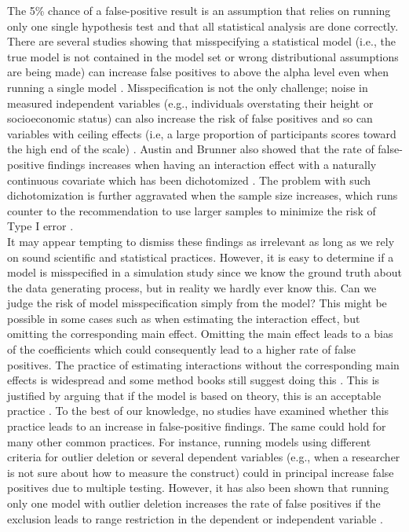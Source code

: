 The 5\% chance of a false-positive result is an assumption that relies on running only one single hypothesis test and that all statistical analysis are done correctly. There are several studies showing that misspecifying a statistical model (i.e., the true model is not contained in the model set or wrong distributional assumptions are being made) can increase false positives to above the alpha level even when running a single model \citep{Dennis2019,Litiere2007}. Misspecification is not the only challenge; noise in measured independent variables (e.g., individuals overstating their height or socioeconomic status) can also increase the risk of false positives \citep{Brunner2009} and so can variables with ceiling effects (i.e, a large proportion of participants scores toward the high end of the scale) \citep{Austin2003}. Austin and Brunner also showed that the rate of false-positive findings increases when having an interaction effect with a naturally continuous covariate which has been dichotomized \citep{Austin2004}. The problem with such dichotomization is further aggravated when the sample size increases, which runs counter to the recommendation to use larger samples to minimize the risk of Type I error \citep{simmons2018}. 
\\
It may appear tempting to dismiss these findings as irrelevant as long as we rely on sound scientific and statistical practices. However, it is easy to determine if a model is misspecified in a simulation study since we know the ground truth about the data generating process, but in reality we hardly ever know this. Can we judge the risk of model misspecification simply from the model? This might be possible in some cases such as when estimating the interaction effect, but omitting the corresponding main effect. Omitting the main effect leads to a bias of the coefficients \citep{Branbor2006} which could consequently lead to a higher rate of false positives. The practice of estimating interactions without the corresponding main effects is widespread \citep{Branbor2006} and some method books still suggest doing this \citep{Cleves2008}. This is justified by arguing that if the model is based on theory, this is an acceptable practice \citep{aiken1991multiple}. To the best of our knowledge, no studies have examined whether this practice leads to an increase in false-positive findings. The same could hold for many other common practices. For instance, running models using different criteria for outlier deletion or several dependent variables (e.g., when a researcher is not sure about how to measure the construct) could in principal increase false positives due to multiple testing. However, it has also been shown that running only one model with outlier deletion increases the rate of false positives if the exclusion leads to range restriction in the dependent or independent variable \citep{Raju2003}. \\        

